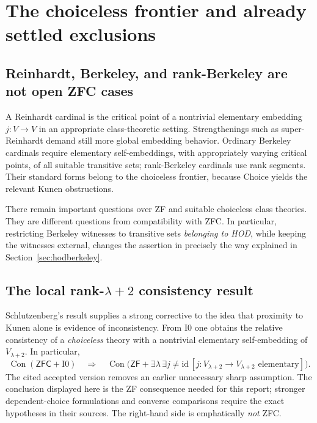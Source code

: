 \documentclass[11pt,letterpaper]{article}
\theoremstyle{definition}
\newcommand{\ZFC}{\mathsf{ZFC}}
\newcommand{\ZF}{\mathsf{ZF}}
\newcommand{\Con}{\operatorname{Con}}
\newcommand{\id}{\mathrm{id}}
\newcommand{\Izero}{\mathrm{I0}}
\begin{document}
\section{The choiceless frontier and already settled exclusions}\label{sec:choice}

\subsection{Reinhardt, Berkeley, and rank-Berkeley are not open ZFC cases}

A Reinhardt cardinal is the critical point of a nontrivial elementary embedding $j:V\to V$ in an appropriate class-theoretic setting. Strengthenings such as super-Reinhardt demand still more global embedding behavior. Ordinary Berkeley cardinals require elementary self-embeddings, with appropriately varying critical points, of all suitable transitive sets; rank-Berkeley cardinals use rank segments. Their standard forms belong to the choiceless frontier, because Choice yields the relevant Kunen obstructions. \cite{hkp,bkw,goldberge}

There remain important questions over ZF and suitable choiceless class theories. They are different questions from compatibility with ZFC. In particular, restricting Berkeley witnesses to transitive sets \emph{belonging to HOD}, while keeping the witnesses external, changes the assertion in precisely the way explained in Section~\ref{sec:hodberkeley}.

\subsection{The local rank-$\lambda+2$ consistency result}

Schlutzenberg's result supplies a strong corrective to the idea that proximity to Kunen alone is evidence of inconsistency. From $\Izero$ one obtains the relative consistency of a \emph{choiceless} theory with a nontrivial elementary self-embedding of $V_{\lambda+2}$. In particular,
\begin{equation}
 \Con(\ZFC+\Izero)\quad\Longrightarrow\quad
 \Con\bigl(\ZF+\exists\lambda\,\exists j\neq\id\,
              [j:V_{\lambda+2}\to V_{\lambda+2}\text{ elementary}]\bigr).
 \label{eq:schlutzenberg}
\end{equation}
The cited accepted version removes an earlier unnecessary sharp assumption. The conclusion displayed here is the ZF consequence needed for this report; stronger dependent-choice formulations and converse comparisons require the exact hypotheses in their sources. The right-hand side is emphatically \emph{not} ZFC. \cite{schlutzenberg}
\end{document}
